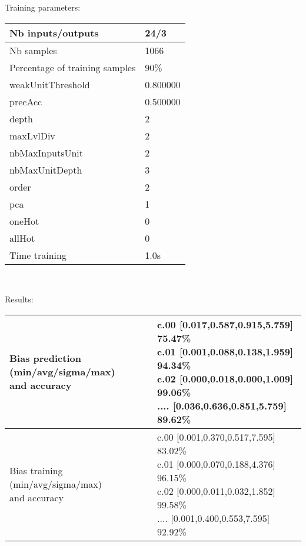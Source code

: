 Training parameters:\\
\begin{center}
\begin{tabular}{|l|l|}
\hline
Nb inputs/outputs&24/3\\
\hline
Nb samples&1066\\
\hline
Percentage of training samples&90\%\\
\hline
weakUnitThreshold&0.800000\\
\hline
precAcc&0.500000\\
\hline
depth&2\\
\hline
maxLvlDiv&2\\
\hline
nbMaxInputsUnit&2\\
\hline
nbMaxUnitDepth&3\\
\hline
order&2\\
\hline
pca&1\\
\hline
oneHot&0\\
\hline
allHot&0\\
\hline
Time training&1.0s\\
\hline
\end{tabular}\\
\end{center}\newline
Results:
\begin{center}
\begin{tabular}{|l|l|}
\hline
\makecell{Bias prediction (min/avg/sigma/max)\\and accuracy}&\makecell{c.00 [0.017,0.587,0.915,5.759] 75.47\%\\
c.01 [0.001,0.088,0.138,1.959] 94.34\%\\
c.02 [0.000,0.018,0.000,1.009] 99.06\%\\
.... [0.036,0.636,0.851,5.759] 89.62\%\\
}\\

\hline
\makecell{Bias training (min/avg/sigma/max)\\and accuracy}&\makecell{c.00 [0.001,0.370,0.517,7.595] 83.02\%\\
c.01 [0.000,0.070,0.188,4.376] 96.15\%\\
c.02 [0.000,0.011,0.032,1.852] 99.58\%\\
.... [0.001,0.400,0.553,7.595] 92.92\%\\
}\\
\hline
\end{tabular}\
\end{center}
